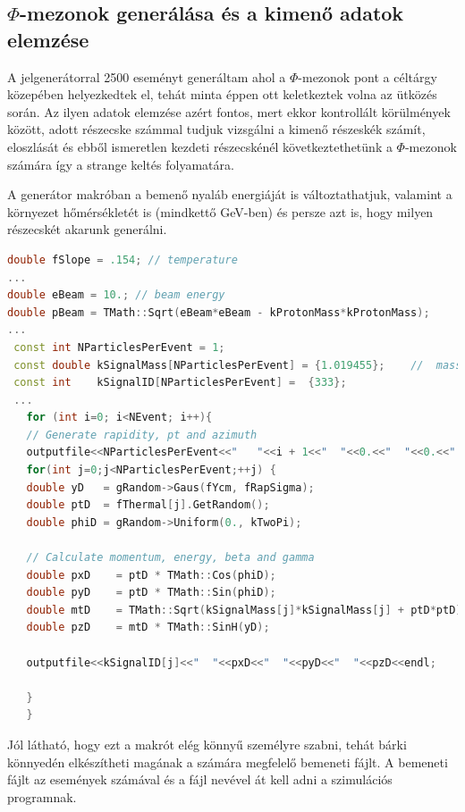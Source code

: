 \documentclass[a4paper,12pt]{article}
\begin{document}
\subsection{ $\Phi$-mezonok generálása és a kimenő adatok elemzése}
\vspace{5mm}
\par A jelgenerátorral 2500 eseményt generáltam ahol a $\Phi$-mezonok pont a céltárgy közepében helyezkedtek el, tehát minta éppen 
ott keletkeztek volna az ütközés során. Az ilyen adatok elemzése azért fontos, mert ekkor kontrollált körülmények között, adott részecske számmal
tudjuk vizsgálni a kimenő részeskék számít, eloszlását és ebből ismeretlen kezdeti részecskénél következtethetünk a $\Phi$-mezonok számára
így a strange keltés folyamatára. 
\par A generátor makróban a bemenő nyaláb energiáját is változtathatjuk, valamint a környezet hőmérsékletét is (mindkettő GeV-ben) és persze
azt is, hogy milyen részecskét akarunk generálni.
\begin{lstlisting}[language=C++]
double fSlope = .154; // temperature
...
double eBeam = 10.; // beam energy
double pBeam = TMath::Sqrt(eBeam*eBeam - kProtonMass*kProtonMass);
...
 const int NParticlesPerEvent = 1;
 const double kSignalMass[NParticlesPerEvent] = {1.019455};    //  mass in GeV
 const int    kSignalID[NParticlesPerEvent] =  {333};
 ...
   for (int i=0; i<NEvent; i++){
   // Generate rapidity, pt and azimuth
   outputfile<<NParticlesPerEvent<<"   "<<i + 1<<"  "<<0.<<"  "<<0.<<"  "<<0.<<endl;
   for(int j=0;j<NParticlesPerEvent;++j) {      
   double yD   = gRandom->Gaus(fYcm, fRapSigma);
   double ptD  = fThermal[j].GetRandom();
   double phiD = gRandom->Uniform(0., kTwoPi);
   
   // Calculate momentum, energy, beta and gamma
   double pxD    = ptD * TMath::Cos(phiD);
   double pyD    = ptD * TMath::Sin(phiD);
   double mtD    = TMath::Sqrt(kSignalMass[j]*kSignalMass[j] + ptD*ptD);
   double pzD    = mtD * TMath::SinH(yD);
   
   outputfile<<kSignalID[j]<<"  "<<pxD<<"  "<<pyD<<"  "<<pzD<<endl;
   
   }
   }
\end{lstlisting}
\par Jól látható, hogy ezt a makrót elég könnyű személyre szabni, tehát bárki könnyedén elkészítheti magának a számára megfelelő
bemeneti fájlt. A bemeneti fájlt az események számával és a fájl nevével át kell adni a szimulációs programnak.
\end{document}
